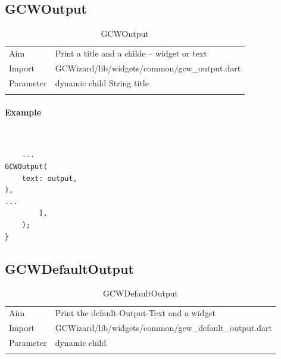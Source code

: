 \subsection{GCWOutput}
\label{fig: GCWOutput}
\begin{table}[H]
\begin{tabular}[h]{p{2cm}p{9cm}}
    \caption{GCWOutput}
    Aim       & Print a title and a childe -- widget or text\\
    Import    & GCWizard/lib/widgets/common/gcw\_output.dart\\
    Parameter & dynamic child\newline
                String title\\
    \label{tab:GCWOutput}
\end{tabular}
\end{table}
\paragraph*{Example} \,
\begin{lstlisting}
    ...
GCWOutput(
    text: output,
),
...
        ],
    );
}
\end{lstlisting}
\label{fig: ExampleGCWOutput}

\newpage
\subsection{GCWDefaultOutput}
\label{fig: GCWDefaultOutput}
\begin{table}[H]
\begin{tabular}[h]{p{2cm}p{9cm}}
    \caption{GCWDefaultOutput}
    Aim       & Print the default-Output-Text and a widget\\
    Import    & GCWizard/lib/widgets/common/gcw\_default\_output.dart\\
    Parameter & dynamic child\\
    \label{tab:GCWDefaultOutput}
\end{tabular}
\end{table}
